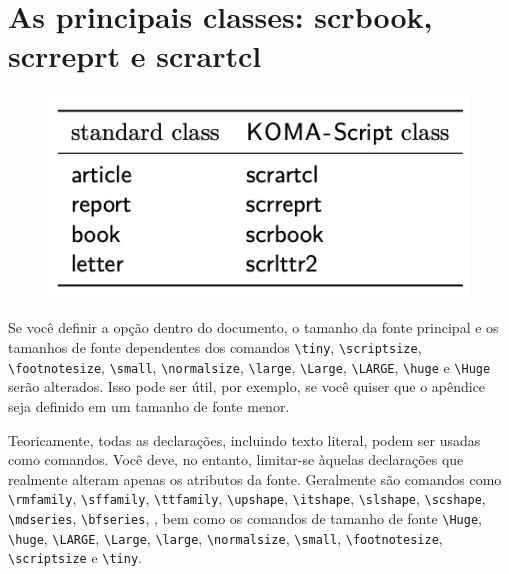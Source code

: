 \chapter[As Principais Classes]{As principais classes: scrbook, scrreprt e scrartcl}
\begin{figure}[h]
    \centering
    \includegraphics[width=0.60\linewidth]{imagens/classes.png}
    \label{fig:class}
\end{figure}

Se você definir a opção dentro do documento, o tamanho da fonte principal e os tamanhos de fonte dependentes dos comandos \verb|\tiny|, \verb|\scriptsize|, \verb|\footnotesize|, \verb|\small|, \verb|\normalsize|, \verb|\large|, \verb|\Large|, \verb|\LARGE|, \verb|\huge| e \verb|\Huge| serão alterados. Isso pode ser útil, por exemplo, se você quiser que o apêndice seja definido em um tamanho de fonte menor.

Teoricamente, todas as declarações, incluindo texto literal, podem ser usadas como comandos. Você deve, no entanto, limitar-se àquelas declarações que realmente alteram apenas os atributos da fonte. Geralmente são comandos como \verb|\rmfamily|, \verb|\sffamily|, \verb|\ttfamily|, \verb|\upshape|, \verb|\itshape|, \verb|\slshape|, \verb|\scshape|, \verb|\mdseries|, \verb|\bfseries|, , bem como os comandos de tamanho de fonte \verb|\Huge|, \verb|\huge|, \verb|\LARGE|, \verb|\Large|, \verb|\large|, \verb|\normalsize|, \verb|\small|, \verb|\footnotesize|, \verb|\scriptsize| e \verb|\tiny|.

